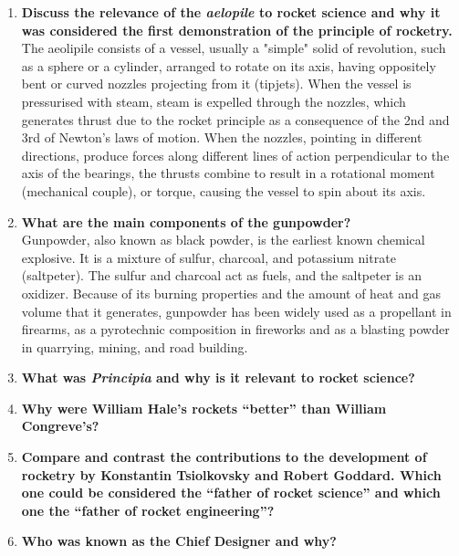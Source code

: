 \documentclass{article}
\begin{document}
\begin{enumerate}
	\item {\bf Discuss the relevance of the \textit{aelopile} to rocket science and why it was considered the first demonstration of the principle of rocketry.}\\

The aeolipile consists of a vessel, usually a "simple" solid of revolution, such as a sphere or a cylinder, arranged to rotate on its axis, having oppositely bent or curved nozzles projecting from it (tipjets). When the vessel is pressurised with steam, steam is expelled through the nozzles, which generates thrust due to the rocket principle as a consequence of the 2nd and 3rd of Newton's laws of motion. When the nozzles, pointing in different directions, produce forces along different lines of action perpendicular to the axis of the bearings, the thrusts combine to result in a rotational moment (mechanical couple), or torque, causing the vessel to spin about its axis. \cite{aeolipile}

	\item {\bf What are the main components of the gunpowder?}\\
	
Gunpowder, also known as black powder, is the earliest known chemical explosive. It is a mixture of sulfur, charcoal, and potassium nitrate (saltpeter). The sulfur and charcoal act as fuels, and the saltpeter is an oxidizer. Because of its burning properties and the amount of heat and gas volume that it generates, gunpowder has been widely used as a propellant in firearms, as a pyrotechnic composition in fireworks and as a blasting powder in quarrying, mining, and road building. \cite{gunpowder}
	
	\item {\bf What was \textit{Principia} and why is it relevant to rocket science?}\\
	
	\item {\bf Why were William Hale’s rockets “better” than William Congreve’s?}\\
	
	\item {\bf Compare and contrast the contributions to the development of rocketry by Konstantin Tsiolkovsky and Robert Goddard. Which one could be considered the “father of rocket science” and which one the “father of rocket engineering”?}\\
	
	\item {\bf Who was known as the Chief Designer and why?}\\
	

\end{enumerate}
\end{document}
